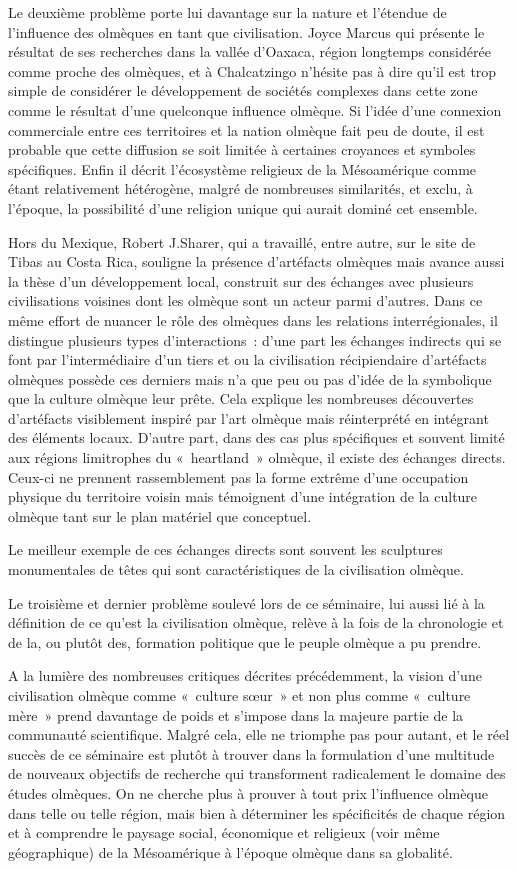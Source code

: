 \documentclass[11pt,a4paper]{article}
\begin{document}
Le deuxième problème porte lui davantage sur la nature et l'étendue de l'influence des olmèques en tant que civilisation. Joyce Marcus qui présente le résultat de ses recherches dans la vallée d'Oaxaca, région longtemps considérée comme proche des olmèques, et à Chalcatzingo n'hésite pas à dire qu'il est trop simple de considérer le développement de sociétés complexes dans cette zone comme le résultat d'une quelconque influence olmèque. Si l'idée d'une connexion commerciale entre ces territoires et la nation olmèque fait peu de doute, il est probable que cette diffusion se soit limitée à certaines croyances et symboles spécifiques. Enfin il décrit l'écosystème religieux de la Mésoamérique comme étant relativement hétérogène, malgré de nombreuses similarités, et exclu, à l'époque, la possibilité d'une religion unique qui aurait dominé cet ensemble.

Hors du Mexique, Robert J.Sharer, qui a travaillé, entre autre, sur le site de Tibas au Costa Rica, souligne la présence d'artéfacts olmèques mais avance aussi la thèse d'un développement local, construit sur des échanges avec plusieurs civilisations voisines dont les olmèque sont un acteur parmi d'autres. Dans ce même effort de nuancer le rôle des olmèques dans les relations interrégionales, il distingue plusieurs types d'interactions~: d'une part les échanges indirects qui se font par l'intermédiaire d'un tiers et ou la civilisation récipiendaire d'artéfacts olmèques possède ces derniers mais n'a que peu ou pas d'idée de la symbolique que la culture olmèque leur prête. Cela explique les nombreuses découvertes d'artéfacts visiblement inspiré par l'art olmèque mais réinterprété en intégrant des éléments locaux. D'autre part, dans des cas plus spécifiques et souvent limité aux régions limitrophes du «~heartland~» olmèque, il existe des échanges directs. Ceux-ci ne prennent rassemblement pas la forme extrême d'une occupation physique du territoire voisin mais témoignent d'une intégration de la culture olmèque tant sur le plan matériel que conceptuel.

Le meilleur exemple de ces échanges directs sont souvent les sculptures monumentales de têtes qui sont caractéristiques de la civilisation olmèque.

Le troisième et dernier problème soulevé lors de ce séminaire, lui aussi lié à la définition de ce qu'est la civilisation olmèque, relève à la fois de la chronologie et de la, ou plutôt des, formation politique que le peuple olmèque a pu prendre.

A la lumière des nombreuses critiques décrites précédemment, la vision d'une civilisation olmèque comme «~culture sœur~» et non plus comme «~culture mère~» prend davantage de poids et s'impose dans la majeure partie de la communauté scientifique. Malgré cela, elle ne triomphe pas pour autant, et le réel succès de ce séminaire est plutôt à trouver dans la formulation d'une multitude de nouveaux objectifs de recherche qui transforment radicalement le domaine des études olmèques. On ne cherche plus à prouver à tout prix l'influence olmèque dans telle ou telle région, mais bien à déterminer les spécificités de chaque région et à comprendre le paysage social, économique et religieux (voir même géographique) de la Mésoamérique à l'époque olmèque dans sa globalité.
\end{document}
